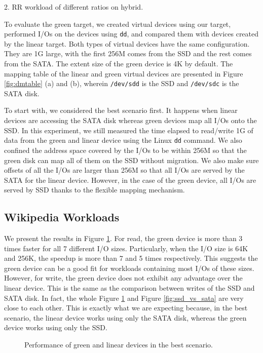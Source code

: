 2. RR workload of different ratios on hybrid.

To evaluate the green target, we created virtual devices using our
target, performed I/Os on the devices using \texttt{dd}, and compared
them with devices created by the linear target.  Both types of virtual
devices have the same configuration. They are 1G large, with the first
256M comes from the SSD and the rest comes from the SATA. The extent
size of the green device is 4K by default. The mapping table of the
linear and green virtual devices are presented in Figure
\ref{fig:dmtable} (a) and (b), wherein \texttt{/dev/sdd} is the SSD
and \texttt{/dev/sdc} is the SATA disk. 

To start with, we considered the best scenario first. It happens when
linear devices are accessing the SATA disk whereas green devices map
all I/Os onto the SSD.  In this experiment, we still measured the time
elapsed to read/write 1G of data from the green and linear device
using the Linux \texttt{dd} command.  We also confined the address
space covered by the I/Os to be within 256M so that the green disk can
map all of them on the SSD without migration.  We also make sure
offsets of all the I/Os are larger than 256M so that all I/Os are
served by the SATA for the linear device. However, in the case of the
green device, all I/Os are served by SSD thanks to the flexible
mapping mechanism.  

\subsection{Wikipedia Workloads}

We present the results in Figure \ref{fig:best}.  For read, the green
device is more than 3 times faster for all 7 different I/O sizes.
Particularly, when the I/O size is 64K and 256K, the speedup is more
than 7 and 5 times respectively. This suggests the green device can be
a good fit for workloads containing most I/Os of these sizes. However,
for write, the green device does not exhibit any advantage over the
linear device. This is the same as the comparison between writes of
the SSD and SATA disk. In fact, the whole Figure \ref{fig:best} and
Figure \ref{fig:ssd_vs_sata} are very close to each other. This is
exactly what we are expecting because, in the best scenario, the
linear device works using only the SATA disk, whereas the green device
works using only the SSD.

\begin{figure}[t]
\begin{centering}
\caption{Performance of green and linear devices in the best
scenario.}
\label{fig:best}
\end{centering}
\end{figure}

